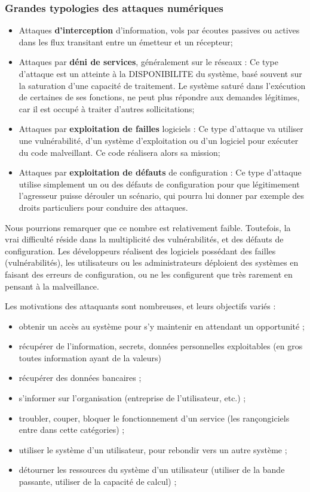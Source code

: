\begin{frame}
\frametitle<presentation>{Grandes typologies des attaques numériques}
\begin{itemize}
\item Attaques \textbf{d’interception} d’information, vols par écoutes passives ou actives dans les flux transitant entre un émetteur et un récepteur;
\item Attaques par \textbf{déni de services}, généralement sur le réseaux : Ce type d’attaque est un atteinte à la DISPONIBILITE du système, basé souvent sur la saturation d’une capacité de traitement. Le système saturé dans l’exécution de certaines de ses fonctions, ne peut plus répondre aux demandes légitimes, car il est occupé à traiter d’autres sollicitations;
\item Attaques par \textbf{exploitation de failles }logiciels : Ce type d’attaque va utiliser une vulnérabilité, d’un système d’exploitation ou d’un logiciel pour exécuter du code malveillant. Ce code réalisera alors sa mission;
\item Attaques par \textbf{exploitation de défauts} de configuration : Ce type d’attaque utilise simplement un ou des défauts de configuration pour que légitimement l’agresseur puisse dérouler un scénario, qui pourra lui donner par exemple des droits particuliers pour conduire des attaques.
\end{itemize}
\end{frame}

Nous pourrions remarquer que ce nombre est relativement faible. Toutefois, la vrai difficulté réside dans la multiplicité des vulnérabilités, et des défauts de configuration. Les développeurs réalisent des logiciels possédant des failles (vulnérabilités), les utilisateurs ou les administrateurs déploient des systèmes en faisant des erreurs de configuration, ou ne les configurent que très rarement en pensant à la malveillance.

Les motivations des attaquants sont nombreuses, et leurs objectifs variés :

\begin{itemize}
\item obtenir un accès au système pour s’y maintenir en attendant un opportunité ;
\item récupérer de l’information, secrets, données personnelles exploitables (en gros toutes information ayant de la valeurs)
\item récupérer des données bancaires ;
\item s'informer sur l'organisation (entreprise de l'utilisateur, etc.) ;
\item troubler, couper, bloquer le fonctionnement d'un service (les rançongiciels entre dans cette catégories) ;
\item utiliser le système d’un utilisateur, pour rebondir vers un autre système ;
\item détourner les ressources du système d’un utilisateur (utiliser de la bande passante, utiliser de la capacité de calcul) ;
\end{itemize}

